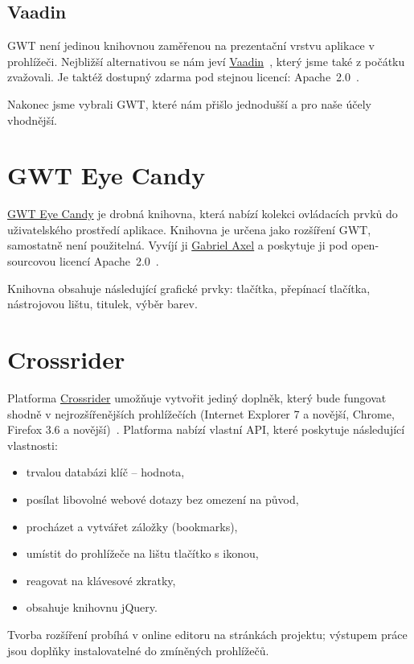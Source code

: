 \subsection{Vaadin}
GWT není jedinou knihovnou zaměřenou na prezentační vrstvu aplikace v prohlížeči.
Nejbližší alternativou se nám jeví \href{https://vaadin.com/home}{Vaadin}~\cite{Vaadin}, který jsme také z počátku zvažovali.
Je taktéž dostupný zdarma pod stejnou licencí: Apache~2.0~\cite{apache20}.

Nakonec jsme vybrali GWT, které nám přišlo jednodušší a pro naše účely vhodnější.

\section{GWT Eye Candy}
\href{http://code.google.com/p/gwt-eye-candy/}{GWT Eye Candy} je drobná knihovna, která nabízí kolekci ovládacích prvků do uživatelského prostředí aplikace.
Knihovna je určena jako rozšíření GWT, samostatně není použitelná.
Vyvíjí ji \href{mailto:guznik@gmail.com}{Gabriel Axel} a poskytuje ji pod open-sourcovou licencí Apache~2.0~\cite{apache20}.

Knihovna obsahuje následující grafické prvky: tlačítka, přepínací tlačítka, nástrojovou lištu, titulek, výběr barev.

\section{Crossrider}
Platforma \href{http://crossrider.com/}{Crossrider} umožňuje vytvořit jediný doplněk, který bude fungovat shodně v nejrozšířenějších prohlížečích (Internet Explorer 7 a novější, Chrome, Firefox 3.6 a novější)~\cite{crossrider-faq}.
Platforma nabízí vlastní API, které poskytuje následující vlastnosti:
\begin{itemize}
	\item trvalou databázi klíč -- hodnota,
	\item posílat libovolné webové dotazy bez omezení na původ,
	\item procházet a vytvářet záložky (bookmarks),
	\item umístit do prohlížeče na lištu tlačítko s ikonou,
	\item reagovat na klávesové zkratky,
	\item obsahuje knihovnu jQuery.
\end{itemize}

Tvorba rozšíření probíhá v online editoru na stránkách projektu; výstupem práce jsou doplňky instalovatelné do zmíněných prohlížečů.

